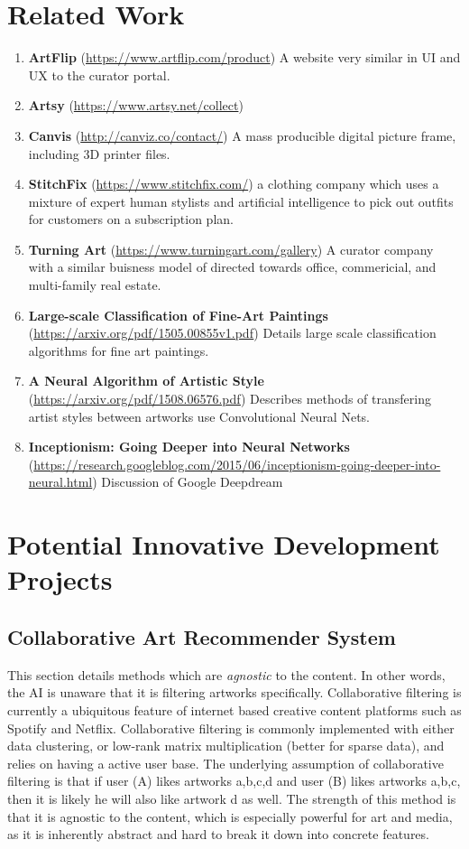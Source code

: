 \documentclass[fontsize=12pt]{scrartcl} %
\numberwithin{equation}{section} %
\numberwithin{figure}{section} %
\numberwithin{table}{section} %
\begin{document}
\section{Related Work}
\begin{enumerate}
    \item\textbf{ArtFlip} (\url{https://www.artflip.com/product}) A website very similar in UI and UX to the curator portal.
    \item\textbf{Artsy}  (\url{https://www.artsy.net/collect})
    \item\textbf{Canvis} (\url{http://canviz.co/contact/})  A mass producible digital picture frame, including 3D printer files.
    \item\textbf{StitchFix} (\url{https://www.stitchfix.com/})  a clothing company which uses a mixture of expert human stylists and artificial intelligence to pick out outfits for customers on a subscription plan.
    \item\textbf{Turning Art} (\url{https://www.turningart.com/gallery}) A curator company with a similar buisness model of directed towards office, commericial, and multi-family real estate.
    \item\textbf{Large-scale Classification of Fine-Art Paintings} (\url{https://arxiv.org/pdf/1505.00855v1.pdf}) Details large scale classification algorithms for fine art paintings.
    \item\textbf{A Neural Algorithm of Artistic Style} (\url{https://arxiv.org/pdf/1508.06576.pdf}) Describes methods of transfering artist styles between artworks use Convolutional Neural Nets.
    \item\textbf{Inceptionism: Going Deeper into Neural Networks} (\url{https://research.googleblog.com/2015/06/inceptionism-going-deeper-into-neural.html}) Discussion of Google Deepdream
\end{enumerate}

\section{Potential Innovative Development Projects}
\subsection{Collaborative Art Recommender System}
 This section details methods which are \textit{agnostic} to the content. In other words, the AI is unaware that it is filtering artworks specifically. Collaborative filtering is currently a ubiquitous feature of internet based creative content platforms such as Spotify and Netflix. Collaborative filtering is commonly implemented with either data clustering, or low-rank matrix multiplication (better for sparse data), and relies on having a active user base. The underlying assumption of collaborative filtering is that if user (A) likes artworks {a,b,c,d} and user (B) likes artworks {a,b,c}, then it is likely he will also like artwork {d} as well. The strength of this method is that it is agnostic to the content, which is especially powerful for art and media, as it is inherently abstract and hard to break it down into concrete features.
\end{document}
